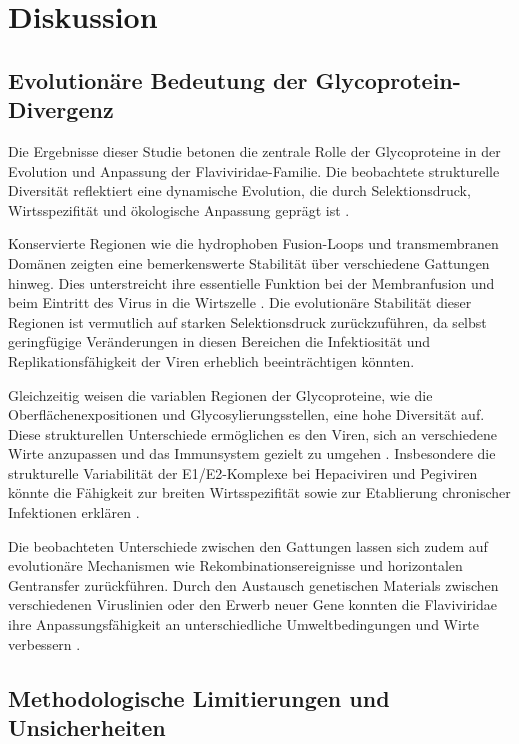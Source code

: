 \chapter{Diskussion} \label{chap:diskussion}

\section{Evolutionäre Bedeutung der Glycoprotein-Divergenz} \label{sec:evolutionaere-bedeutung-der-glycoprotein-divergenz}

Die Ergebnisse dieser Studie betonen die zentrale Rolle der Glycoproteine in der Evolution und Anpassung der Flaviviridae-Familie. Die beobachtete strukturelle Diversität reflektiert eine dynamische Evolution, die durch Selektionsdruck, Wirtsspezifität und ökologische Anpassung geprägt ist \autocite{mifsudMappingGlycoproteinStructure2024}.

Konservierte Regionen wie die hydrophoben Fusion-Loops und transmembranen Domänen zeigten eine bemerkenswerte Stabilität über verschiedene Gattungen hinweg. Dies unterstreicht ihre essentielle Funktion bei der Membranfusion und beim Eintritt des Virus in die Wirtszelle \autocite{Modis2004, Rey1995}. Die evolutionäre Stabilität dieser Regionen ist vermutlich auf starken Selektionsdruck zurückzuführen, da selbst geringfügige Veränderungen in diesen Bereichen die Infektiosität und Replikationsfähigkeit der Viren erheblich beeinträchtigen könnten.

Gleichzeitig weisen die variablen Regionen der Glycoproteine, wie die Oberflächenexpositionen und Glycosylierungsstellen, eine hohe Diversität auf. Diese strukturellen Unterschiede ermöglichen es den Viren, sich an verschiedene Wirte anzupassen und das Immunsystem gezielt zu umgehen \autocite{Lavie2017}. Insbesondere die strukturelle Variabilität der E1/E2-Komplexe bei Hepaciviren und Pegiviren könnte die Fähigkeit zur breiten Wirtsspezifität sowie zur Etablierung chronischer Infektionen erklären \autocite{Vieyres2013}.

Die beobachteten Unterschiede zwischen den Gattungen lassen sich zudem auf evolutionäre Mechanismen wie Rekombinationsereignisse und horizontalen Gentransfer zurückführen. Durch den Austausch genetischen Materials zwischen verschiedenen Viruslinien oder den Erwerb neuer Gene konnten die Flaviviridae ihre Anpassungsfähigkeit an unterschiedliche Umweltbedingungen und Wirte verbessern \autocite{Weaver2009}.

\section{Methodologische Limitierungen und Unsicherheiten} \label{sec:methodologische-limitierungen-und-unsicherheiten}

